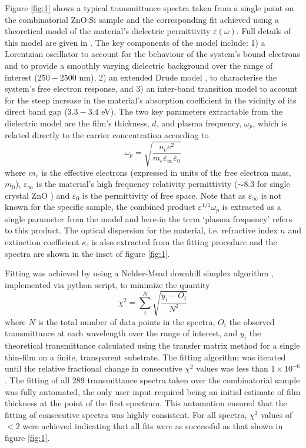 \documentclass[aps,prl,preprint,showpacs,showkeys, linenumbers]{revtex4-1}
\begin{document}
Figure \ref{fig:1} shows a typical transmittance spectra taken from a single point on the combinatorial ZnO:Si sample and the corresponding fit achieved using a theoretical model of the material's dielectric permittivity $\varepsilon(\omega)$. Full details of this model are given in \cite{Treharne2012}. The key components of the model include: 1) a Lorentzian oscillator to account for the behaviour of the system's bound electrons and to provide a smoothly varying dielectric background over the range of interest ($250-2500$ nm), 2) an extended Drude model \cite{Mergel2002}, to characterise the system's free electron response, and 3) an inter-band transition model to account for the steep increase in the material's absorption coefficient in the vicinity of its direct band gap ($3.3 - 3.4$ eV). The two key parameters extractable from the dielectric model are the film's thickness, $d$, and plasma frequency, $\omega_{p}$, which is related directly to the carrier concentration according to
\begin{equation}
\label{eqn:1}
\omega_p = \sqrt{\frac{n_e e^2}{m_e\varepsilon_{\infty} \varepsilon_0}}
\end{equation}
where $m_e$ is the effective electrons (expressed in units of the free electron mass, $m_0$), $\varepsilon_{\infty}$ is the material's high frequency relativity permittivity  ($\sim 8.3$ for single crystal ZnO \citep{Ashkenov2003}) and $\varepsilon_0$ is the permittivity of free space. Note that as $\varepsilon_{\infty}$ is not known for the specific sample, the combined product $\varepsilon^{1/1}\omega_p$ is extracted as a single parameter from the model and here-in the term `plasma frequency' refers to this product. The optical dispersion for the material, i.e. refractive index $n$ and extinction coefficient $\kappa$, is also extracted from the fitting procedure and the spectra are shown in the inset of figure \ref{fig:1}.

Fitting was achieved by using a Nelder-Mead downhill simplex algorithm \cite{Nelder1965}, implemented via python script, to minimize the quantity
\begin{equation}
\chi^{2} = \sum_{i}^N\sqrt{\frac{y_i - O_i}{N^2}}
\end{equation}\label{eqn:2}
where $N$ is the total number of data points in the spectra, $O_i$ the observed transmittance at each wavelength over the range of interest, and $y_i$ the theoretical transmittance calculated using the transfer matrix method \cite{Macleod1986} for a single thin-film on a finite, transparent substrate.  The fitting algorithm was iterated until the relative fractional change in consecutive $\chi^2$ values was less than $1\times10^{-6}$. The fitting of all 289 transmittance spectra taken over the combinatorial sample was fully automated, the only user input required being an initial estimate of film thickness at the point of the first spectrum. This automation ensured that the fitting of consecutive spectra was highly consistent. For all spectra, $\chi^2$ values of $<2$ were achieved indicating that all fits were as successful as that shown in figure \ref{fig:1}.
\end{document}
